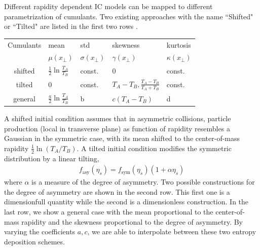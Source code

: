 \documentclass[aps,prl,twocolumn,groupedaddress]{revtex4-1}
\begin{document}
	Different rapidity dependent IC models can be mapped to different parametrization of cumulants. Two existing approaches with the name ``Shifted" or ``Tilted" are listed in the first two rows \cite{Bozek:2010bi}.
	\begin{widetext}
	\begin{center}
	\begin{tabularx}{0.8\textwidth}{c *{4}{Y}}
	\toprule[1pt]
	Cumulants & mean &	std	& skewness	& kurtosis \\
		&	$\mu(x_\perp)$ & $\sigma(x_\perp)$& $\gamma(x_\perp)$  & $\kappa(x_\perp)$	\\
	\midrule[0.5pt]
	shifted & $\frac{1}{2}\ln\frac{T_A}{T_B}$ & const. &  $0$	&const.\\
	tilted & $0$ & const.& $T_A - T_B, \frac{T_A-T_B}{T_A+T_B}$	& const.\\
	general & $\frac{a}{2}\ln\frac{T_A}{T_B}$& b  & $c(T_A - T_B)$ & d \\
	\bottomrule[1pt]
	\end{tabularx}
	\end{center}
	\end{widetext}
	A shifted initial condition assumes that in asymmetric collisions, particle production (local in transverse plane) as function of rapidity resembles a Gaussian in the symmetric case, with its mean shifted to the center-of-mass rapidity $\frac{1}{2}\ln(T_A/T_B)$. 
	A tilted initial condition modifies the symmetric distribution by a linear tilting,
	\begin{eqnarray}
	f_{\textrm{asy}}(\eta_s) = f_{\textrm{sym}}(\eta_s) (1+\alpha \eta_s)
	\end{eqnarray}
	where $\alpha$ is a measure of the degree of asymmetry. 
	Two possible constructions for the degree of asymmetry are shown in the second row. 
	This first one is a dimensionfull quantity while the second is a dimensionless construction. 
	In the last row, we show a general case with the mean proportional to the center-of-mass rapidity and the skewness proportional to the degree of asymmetry. 
	By varying the coefficients $a, c$, we are able to interpolate between these two entropy deposition schemes.
	
\end{document}
